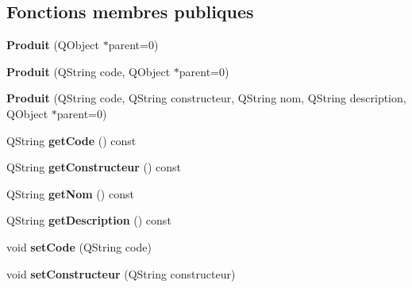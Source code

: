\subsection*{Fonctions membres publiques}
\begin{DoxyCompactItemize}
\item 
\hypertarget{class_core_1_1_produit_aa2985157600e8bcc14066d4a6c409b58}{
{\bfseries Produit} (QObject $\ast$parent=0)}
\label{d3/d87/class_core_1_1_produit_aa2985157600e8bcc14066d4a6c409b58}

\item 
\hypertarget{class_core_1_1_produit_af0d0d292e28cd8ca27716658085c8d06}{
{\bfseries Produit} (QString code, QObject $\ast$parent=0)}
\label{d3/d87/class_core_1_1_produit_af0d0d292e28cd8ca27716658085c8d06}

\item 
\hypertarget{class_core_1_1_produit_a08bff6e31a0d67b18c18871555ef4caa}{
{\bfseries Produit} (QString code, QString constructeur, QString nom, QString description, QObject $\ast$parent=0)}
\label{d3/d87/class_core_1_1_produit_a08bff6e31a0d67b18c18871555ef4caa}

\item 
\hypertarget{class_core_1_1_produit_a94212643b93f6299aff4b5a9b090f89c}{
QString {\bfseries getCode} () const }
\label{d3/d87/class_core_1_1_produit_a94212643b93f6299aff4b5a9b090f89c}

\item 
\hypertarget{class_core_1_1_produit_acf669ae426d5dc80b8600d23fffe64ed}{
QString {\bfseries getConstructeur} () const }
\label{d3/d87/class_core_1_1_produit_acf669ae426d5dc80b8600d23fffe64ed}

\item 
\hypertarget{class_core_1_1_produit_a2414900a8ab334bfc1cab191fe3abe12}{
QString {\bfseries getNom} () const }
\label{d3/d87/class_core_1_1_produit_a2414900a8ab334bfc1cab191fe3abe12}

\item 
\hypertarget{class_core_1_1_produit_a1afefe251b7e14c6d78f19f55fbdbc21}{
QString {\bfseries getDescription} () const }
\label{d3/d87/class_core_1_1_produit_a1afefe251b7e14c6d78f19f55fbdbc21}

\item 
\hypertarget{class_core_1_1_produit_a12f13870a2373d6a02517050cbd68a5b}{
void {\bfseries setCode} (QString code)}
\label{d3/d87/class_core_1_1_produit_a12f13870a2373d6a02517050cbd68a5b}

\item 
\hypertarget{class_core_1_1_produit_a690ce68de1f35f3f18363fabe8843a2a}{
void {\bfseries setConstructeur} (QString constructeur)}
\label{d3/d87/class_core_1_1_produit_a690ce68de1f35f3f18363fabe8843a2a}


\end{DoxyCompactItemize}
